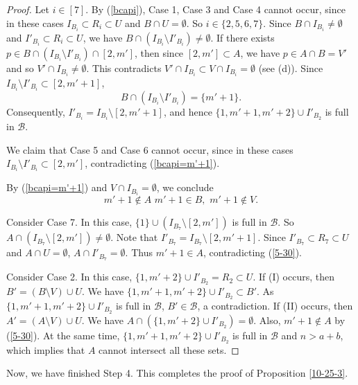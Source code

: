 \documentclass[11pt]{article}
\newcommand{\m}{\mathcal}
\begin{document}
\begin{proof}
Let $i\in [7]$.
By (\ref{bcapi}),
Case 1, Case 3 and Case 4 cannot occur, since in these cases $I_{B_i}\subset R_i\subset U$ and $B\cap U=\emptyset$.
So $i\in \{2,5,6,7\}$. 
Since $B\cap I_{B_i}\ne \emptyset$ and $I'_{B_i}\subset R_i\subset U$, we have $B\cap (I_{B_i}\setminus I'_{B_i})\ne \emptyset$.
If there exists $p\in B\cap (I_{B_i}\setminus I'_{B_i})\cap [2,m']$, then since $[2,m']\subset A$, we have $p\in A\cap B=V'$ and so $V'\cap I_{B_i}\ne \emptyset$. This contradicts $V'\cap I_{B_i}\subset V\cap I_{B_i}= \emptyset$ (see (d)). 
Since $I_{B_i}\setminus I'_{B_i} \subset [2,m'+1]$,
\begin{equation}\label{bcapi=m'+1}
 B\cap (I_{B_i}\setminus I'_{B_i} )=\{m'+1\}.   
\end{equation}
Consequently, $I'_{B_i}=I_{B_i}\setminus [2,m'+1]$, and hence 
$\{1,m'+1,m'+2\}\cup I'_{B_2}$ is full in $\m B$. 

We claim that Case 5 and Case 6 cannot occur, since in these cases $I_{B_i}\setminus I'_{B_i} \subset [2,m']$, contradicting (\ref{bcapi=m'+1}).

By (\ref{bcapi=m'+1}) and $V\cap I_{B_i}=\emptyset$, we conclude 
\begin{equation}\label{5-30}
m'+1\not\in A\,\, m'+1\in B, \,\,m'+1\not\in V.    
\end{equation}

Consider Case 7. In this case, $\{1\}\cup (I_{B_7}\setminus [2,m'])$ is full in $\m B$. 
So $A\cap (I_{B_7}\setminus [2,m'])\ne \emptyset$.
Note that $I'_{B_7}=I_{B_7}\setminus [2,m'+1]$.
Since $I'_{B_7}\subset R_7\subset U$ and $A\cap U=\emptyset$, 
$A\cap I'_{B_7}=\emptyset$. Thus $m'+1\in A$, contradicting (\ref{5-30}).

Consider Case 2. In this case, $\{1,m'+2\}\cup I'_{B_2}=R_2\subset U$. 
If (I) occurs, then $B'=(B \setminus V)\cup U$.  We have 
$\{1,m'+1,m'+2\}\cup I'_{B_2}\subset B'$. 
As $\{1,m'+1,m'+2\}\cup I'_{B_2}$ is full in $\m B$, $B'\in \m B$, a contradiction.
If (II) occurs, then $A'=(A \setminus V)\cup U$. 
We have $A\cap (\{1,m'+2\}\cup I'_{B_2})=\emptyset$.  Also, $m'+1\notin A$ by (\ref{5-30}).  
At the same time, $\{1,m'+1,m'+2\}\cup I'_{B_2}$ is full in $\m B$ and $n>a+b$, which implies that $A$ cannot intersect all these sets.
\end{proof}

Now, we have finished Step 4. This completes the proof of Proposition \ref{10-25-3}.
\end{document}

